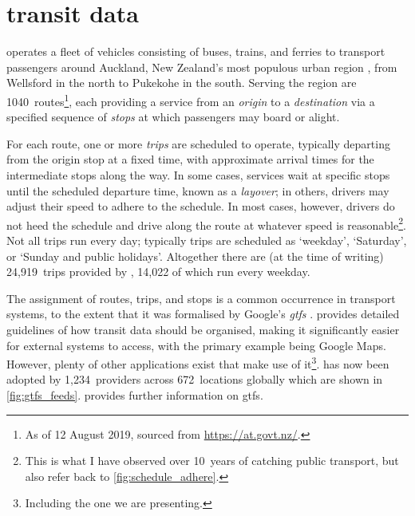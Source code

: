 \chapter{\Rt{} transit data}
\label{cha:data}



\AT{} operates a fleet of vehicles consisting of buses, trains, and ferries to transport passengers around Auckland, New Zealand's most populous urban region \citep{StatsNZ_2019}, from Wellsford in the north to Pukekohe in the south. Serving the region are 1040~routes\footnote{As of 12 August 2019, sourced from \url{https://at.govt.nz/}.}, each providing a service from an \emph{origin} to a \emph{destination} via a specified sequence of \emph{stops} at which passengers may board or alight.


For each route, one or more \emph{trips} are scheduled to operate, typically departing from the origin stop at a fixed time, with approximate arrival times for the intermediate stops along the way. In some cases, services wait at specific stops until the scheduled departure time, known as a \emph{layover}; in others, drivers may adjust their speed to adhere to the schedule. In most cases, however, drivers do not heed the schedule and drive along the route at whatever speed is reasonable\footnote{This is what I have observed over 10~years of catching public transport, but also refer back to \cref{fig:schedule_adhere}.}. Not all trips run every day; typically trips are scheduled as `weekday', `Saturday', or `Sunday and public holidays'. Altogether there are (at the time of writing) 24,919~trips provided by \AT{}, 14,022 of which run every weekday.


The assignment of routes, trips, and stops is a common occurrence in transport systems, to the extent that it was formalised by Google's \emph{\acrfull{gtfs}} \citep {GoogleDevelopers_2006}. \GTFS{} provides detailed guidelines of how transit data should be organised, making it significantly easier for external systems to access, with the primary example being Google Maps. However, plenty of other applications exist that make use of it\footnote{Including the one we are presenting.}. \GTFS{} has now been adopted by 1,234~providers across 672~locations globally which are shown in \cref{fig:gtfs_feeds}.  provides further information on \gls{gtfs}.

